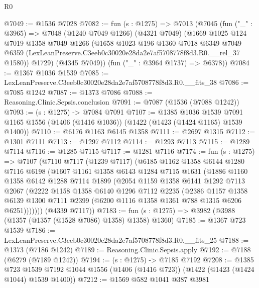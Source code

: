 \begin{lexlean}{R0}
\begin{coremodule}
@7049 := @1536 @7028
@7082 := fun (s : @1275) =>
  @7013
    (@7045
      (fun ("_" : @3965) =>
      @7048
        (@1240 @7049 @1266)
        (@4321 @7049)
        (@1669
          @1025
          @124
          @7019
          @1358
          @7049
          @1266
          (@1658
            @1023
            @196
            @1360
            @7018
            @6349
            @7049
            @6359
            (LexLeanPreserve.C3eeb0c30020e28da2e7af5708778f8d3.R0.__rel_37 @1580))
          @1729)
        (@4345 @7049))
      (fun ("_" : @3964 @1737) => @6378))
@7084 := @1367 @1036 @1539
@7085 := LexLeanPreserve.C3eeb0c30020e28da2e7af5708778f8d3.R0.__fits_38
@7086 := @7085 @1242
@7087 := @1373 @7086
@7088 := Reasoning.Clinic.Sepsis.conclusion
@7091 := @7087 (@1536 (@7088 @1242))
@7093 := (s : @1275) -> @7084 @7091
@7107 := @1385
    @1036
    @1539
    @7091
    @1165
    @1556
    (@1406 (@1416 @1036))
    (@1422 (@1423 (@1424 @1165) @1539 @1400))
@7110 := @6176 @1163 @6145 @1358
@7111 := @2697 @1315
@7112 := @1301 @7111
@7113 := @1297 @7112
@7114 := @1293 @7113
@7115 := @1289 @7114
@7116 := @1285 @7115
@7117 := @1281 @7116
@7174 := fun (s : @1275) =>
  @7107
    (@7110
      @7117
      (@1239 @7117)
      (@6185
        @1162
        @1358
        @6144
        @1280
        @7116
        @6198
        (@1607
          @1161
          @1358
          @6143
          @1284
          @7115
          @1631
          (@1886
            @1160
            @1358
            @6142
            @1288
            @7114
            @1899
            (@2054
              @1159
              @1358
              @6141
              @1292
              @7113
              @2067
              (@2222
                @1158
                @1358
                @6140
                @1296
                @7112
                @2235
                (@2386
                  @1157
                  @1358
                  @6139
                  @1300
                  @7111
                  @2399
                  (@6200 @1116 @1358 @1361 @788 @1315 @6206 @6251)))))))
      (@4339 @7117))
@7183 := fun (s : @1275) => @3982 (@3988 (@1357 (@1357 (@1528 @7086) @1358) @1358) @1360)
@7185 := @1367 @723 @1539
@7186 := LexLeanPreserve.C3eeb0c30020e28da2e7af5708778f8d3.R0.__fits_25
@7188 := @1373 (@7186 @1242)
@7189 := Reasoning.Clinic.Sepsis.apply
@7192 := @7188 (@6279 (@7189 @1242))
@7194 := (s : @1275) -> @7185 @7192
@7208 := @1385
    @723
    @1539
    @7192
    @1044
    @1556
    (@1406 (@1416 @723))
    (@1422 (@1423 (@1424 @1044) @1539 @1400))
@7212 := @1569 @582 @1041 @387 @3981

\end{coremodule}
\end{lexlean}
